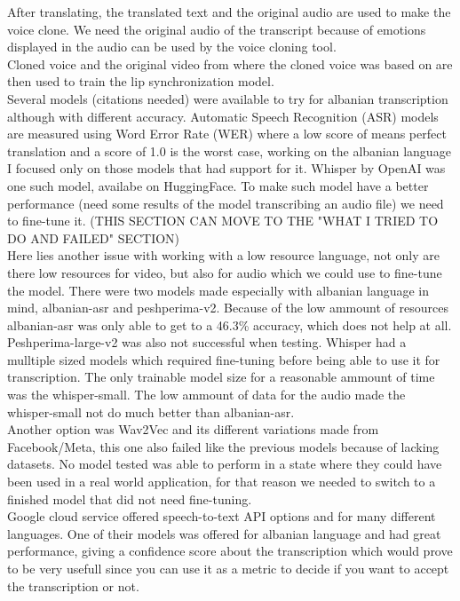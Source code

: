 \documentclass[12pt]{article}
\begin{document}
After translating, the translated text and the original audio are used to make the voice clone. We need the original audio of the transcript because of emotions displayed in the audio can be used by the voice cloning tool.\\
Cloned voice and the original video from where the cloned voice was based on are then used to train the lip synchronization model. 
\\Several models (citations needed) were available to try for albanian transcription although with different accuracy. Automatic Speech Recognition (ASR) models are measured using Word Error Rate (WER) where a low score of means perfect translation and a score of 1.0 is the worst case, working on the albanian language I focused only on those models that had support for it. Whisper by OpenAI was one such model, availabe on HuggingFace. To make such model have a better performance (need some results of the model transcribing an audio file) we need to fine-tune it. (THIS SECTION CAN MOVE TO THE "WHAT I TRIED TO DO AND FAILED" SECTION)\\
Here lies another issue with working with a low resource language, not only are there low resources for video, but also for audio which we could use to fine-tune the model. There were two models made especially with albanian language in mind, albanian-asr and peshperima-v2. Because of the low ammount of resources albanian-asr was only able to get to a 46.3\% accuracy, which does not help at all. Peshperima-large-v2 was also not successful when testing. Whisper had a mulltiple sized models which required fine-tuning before being able to use it for transcription. The only trainable model size for a reasonable ammount of time was the whisper-small. The low ammount of data for the audio made the whisper-small not do much better than albanian-asr. \\
Another option was Wav2Vec and its different variations made from Facebook/Meta, this one also failed like the previous models because of lacking datasets. No model tested was able to perform in a state where they could have been used in a real world application, for that reason we needed to switch to a finished model that did not need fine-tuning.\\
Google cloud service offered speech-to-text API options and for many different languages. One of their models was offered for albanian language and had great performance, giving a confidence score about the transcription which would prove to be very usefull since you can use it as a metric to decide if you want to accept the transcription or not. \\
\end{document}
